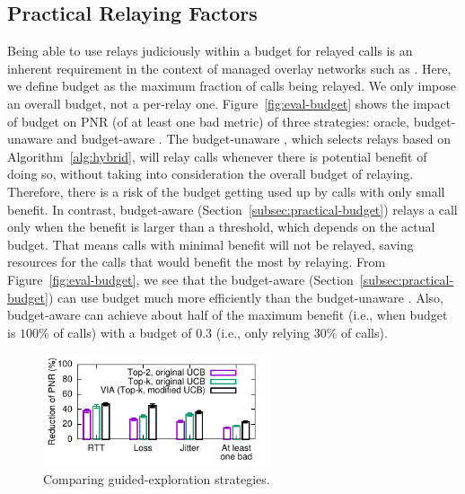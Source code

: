 
\subsection{Practical Relaying Factors}
\label{subsec:eval-parameter}



 Being able to use relays judiciously within a budget for relayed calls is an inherent requirement in the context of managed overlay networks such as \hybrid. 
Here, we define budget as the maximum fraction of calls being relayed. {We only impose an overall budget, not a per-relay one.}
Figure~\ref{fig:eval-budget} shows the impact of budget on PNR (of at least one bad metric) of three strategies: oracle, budget-unaware \hybrid and budget-aware \hybrid. The budget-unaware \hybrid, which selects relays based on Algorithm~\ref{alg:hybrid}, will relay calls whenever there is potential benefit of doing so, without taking into consideration the overall budget {of relaying}. Therefore, there is a risk of the budget getting used up by calls with only small benefit.
In contrast, budget-aware \hybrid (Section~\ref{subsec:practical-budget}) relays a call only when the benefit is larger than a threshold, which depends on the actual budget. That means calls with minimal benefit will not be relayed, saving resources for the calls that would benefit the most by relaying.
From Figure~\ref{fig:eval-budget}, we see that the budget-aware \hybrid (Section~\ref{subsec:practical-budget}) can use budget much more efficiently than the budget-unaware \hybrid. 
Also, budget-aware \hybrid can achieve about half of the maximum benefit (i.e., when budget is $100\%$ of calls) with a budget of $0.3$ (i.e., only relying $30\%$ of calls).%

\begin{figure}[t!]
\centering
\includegraphics[width=0.6\textwidth]{figures/Via-Eval-Bar-MinChoices-5-VIA-ComponentWise-PNR.pdf}
\caption{Comparing guided-exploration strategies.}
\label{fig:eval-component-ucb}
\end{figure}

